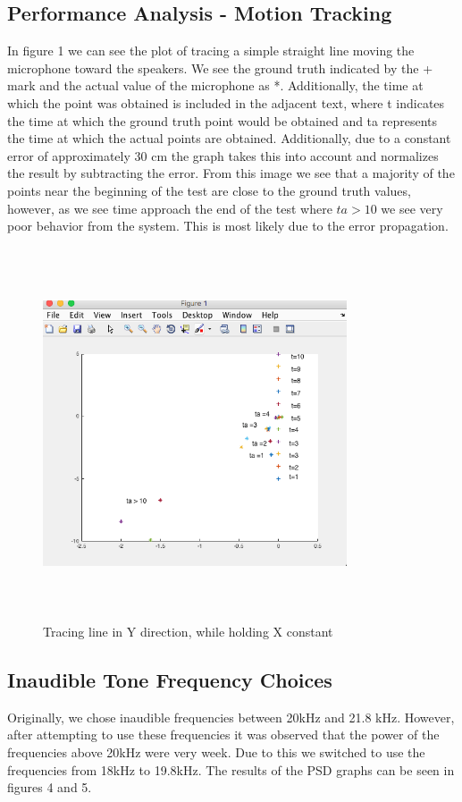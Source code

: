 \documentclass{acm_proc_article-sp}
\begin{document}
\subsection{Performance Analysis - Motion Tracking}
In figure 1 we can see the plot of tracing a simple straight line moving the microphone toward the speakers. We see the ground truth indicated by the + mark and the actual value of the microphone as *. Additionally, the time at which the point was obtained is included in the adjacent text, where t indicates the time at which the ground truth point would be obtained and ta represents the time at which the actual points are obtained. Additionally, due to a constant error of approximately 30 cm the graph takes this into account and normalizes the result by subtracting the error. From this image we see that a majority of the points near the beginning of the test are close to the ground truth values, however, as we see time approach the end of the test where $ta > 10$ we see very poor behavior from the system. This is most likely due to the error propagation.
\begin{figure}[h]
\caption{Tracing line in Y direction, while holding X constant}
\includegraphics[width=9cm, height=11cm]{TracingY}
\end{figure}

\subsection{Inaudible Tone Frequency Choices}
Originally, we chose inaudible frequencies between 20kHz and 21.8 kHz. However, after attempting to use these frequencies it was observed that the power of the frequencies above 20kHz were very week. Due to this we switched to use the frequencies from 18kHz to 19.8kHz. The results of the PSD graphs can be seen in figures 4 and 5.
\end{document}
